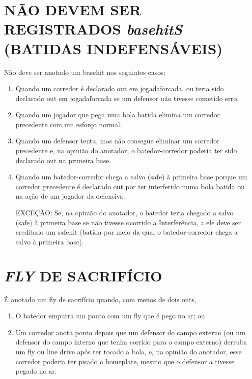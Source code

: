 \section{NÃO DEVEM SER REGISTRADOS \textit{basehitS} (BATIDAS INDEFENSÁVEIS)}

		 Não deve ser anotado um \gls{basehit} nos seguintes casos:

		\begin{enumerate}[label=(\alph*)]
			\item  Quando um corredor é declarado \gls{out} em \gls{jogadaforcada}, ou teria sido declarado \gls{out} em \gls{jogadaforcada} se um defensor não tivesse cometido erro.
			\item Quando um jogador que pega uma bola batida elimina um corredor precedente com um esforço normal.
			\item Quando um defensor tenta, mas não consegue eliminar um corredor precedente e, na opinião do anotador, o batedor-corredor poderia ter sido declarado \gls{out} na primeira base.
			\item Quando um batedor-corredor chega a salvo (\gls{safe}) à primeira base porque um corredor precedente é declarado \gls{out} por ter interferido numa bola batida ou na ação de um jogador da defensiva.

		 EXCEÇÃO: Se, na opinião do anotador, o batedor teria chegado a salvo (\gls{safe}) à primeira base se não tivesse ocorrido a Interferência, a ele deve ser creditado um \gls{safehit} (batida por meio da qual o batedor-corredor chega a salvo à primeira base).
		\end{enumerate}

	\section{\textit{FLY} DE SACRIFÍCIO}

		É anotado um \gls{fly} de sacrifício quando, com menos de dois \glspl{out},

			\begin{enumerate}[label=(\alph*)]
			\item  O batedor empurra um ponto com um \gls{fly} que é pego no ar; ou
			\item Um corredor anota ponto depois que um defensor do campo externo (ou um defensor do campo interno que tenha corrido para o campo externo) derruba um \gls{fly} ou \gls{line drive} após ter tocado a bola, e, na opinião do anotador, esse corredor poderia ter pisado o \gls{homeplate}, mesmo que o defensor a tivesse pegado no ar.
		\end{enumerate}

